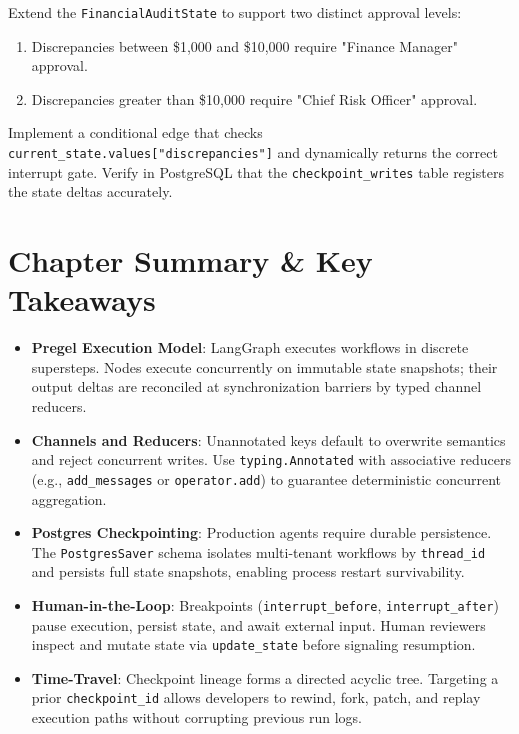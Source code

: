 \begin{tryityourselfbox}
Extend the \texttt{FinancialAuditState} to support two distinct approval levels:
\begin{enumerate}
  \item Discrepancies between \$1,000 and \$10,000 require "Finance Manager" approval.
  \item Discrepancies greater than \$10,000 require "Chief Risk Officer" approval.
\end{enumerate}
Implement a conditional edge that checks \texttt{current\_state.values["discrepancies"]} and dynamically returns the correct interrupt gate. Verify in PostgreSQL that the \texttt{checkpoint\_writes} table registers the state deltas accurately.
\end{tryityourselfbox}

\section{Chapter Summary \& Key Takeaways}
\begin{itemize}[leftmargin=18pt]
  \item \textbf{Pregel Execution Model}: LangGraph executes workflows in discrete supersteps. Nodes execute concurrently on immutable state snapshots; their output deltas are reconciled at synchronization barriers by typed channel reducers.
  \item \textbf{Channels and Reducers}: Unannotated keys default to overwrite semantics and reject concurrent writes. Use \texttt{typing.Annotated} with associative reducers (e.g., \texttt{add\_messages} or \texttt{operator.add}) to guarantee deterministic concurrent aggregation.
  \item \textbf{Postgres Checkpointing}: Production agents require durable persistence. The \texttt{PostgresSaver} schema isolates multi-tenant workflows by \texttt{thread\_id} and persists full state snapshots, enabling process restart survivability.
  \item \textbf{Human-in-the-Loop}: Breakpoints (\texttt{interrupt\_before}, \texttt{interrupt\_after}) pause execution, persist state, and await external input. Human reviewers inspect and mutate state via \texttt{update\_state} before signaling resumption.
  \item \textbf{Time-Travel}: Checkpoint lineage forms a directed acyclic tree. Targeting a prior \texttt{checkpoint\_id} allows developers to rewind, fork, patch, and replay execution paths without corrupting previous run logs.
\end{itemize}

